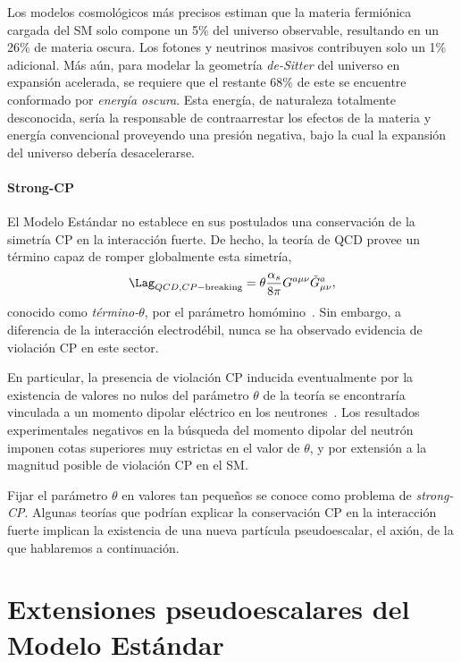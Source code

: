 Los modelos cosmológicos más precisos estiman que la materia fermiónica cargada del SM solo compone un 5\% del universo observable, resultando en un 26\% de materia oscura. Los fotones y neutrinos masivos contribuyen solo un 1\% adicional. Más aún, para modelar la geometría \textit{de-Sitter} del universo en expansión acelerada, se requiere que el restante 68\% de este se encuentre conformado por \textit{energía oscura}. Esta energía, de naturaleza totalmente desconocida, sería la responsable de contraarrestar los efectos de la materia y energía convencional proveyendo una presión negativa, bajo la cual la expansión del universo debería desacelerarse.


\paragraph{Strong-CP}

El Modelo Estándar no establece en sus postulados una conservación de la simetría CP en la interacción fuerte. De hecho, la teoría de QCD provee un término capaz de romper globalmente esta simetría, 
\begin{equation}
  \Lag_{QCD, CP-\text{breaking}} = \theta \frac{\alpha_s}{8\pi} G^{a\mu\nu} \tilde{G}^a_{\mu\nu},
  \label{eq:ch1:SM:limitations:QCD_CP-breaking}
\end{equation}
conocido como \textit{término-$\theta$}, por el parámetro homómino~\cite{Baluni1979}. Sin embargo, a diferencia de la interacción electrodébil, nunca se ha observado evidencia de violación CP en este sector. 

En particular, la presencia de violación CP inducida eventualmente por la existencia de valores no nulos del parámetro $\theta$ de la teoría se encontraría vinculada a un momento dipolar eléctrico en los neutrones~\cite{Crewther1979}. Los resultados experimentales negativos en la búsqueda del momento dipolar del neutrón~\cite{Harris1999} imponen cotas superiores muy estrictas en el valor de $\theta$, y por extensión a la magnitud posible de violación CP en el SM. 

Fijar el parámetro $\theta$ en valores tan pequeños se conoce como problema de \textit{strong-CP}. Algunas teorías que podrían explicar la conservación CP en la interacción fuerte implican la existencia de una nueva partícula pseudoescalar, el axión, de la que hablaremos a continuación.




\section{Extensiones pseudoescalares del Modelo Estándar}

